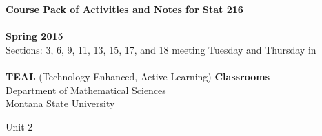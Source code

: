 \documentclass[12pt]{article}
\def\unitNum{1}
\begin{document}
 \begin{titlepage}
  \vspace*{2in}
 \begin{center}
 {\Large \bf  Course Pack of Activities and Notes for Stat 216}\\
  \ \\
  {\large\bf Spring 2015} \vspace{.2in}\\
  Sections: 3, 6, 9, 11, 13, 15, 17, and 18  meeting Tuesday and Thursday
  in\\
  \ \\
  {\Large \bf TEAL} (Technology Enhanced, Active Learning) {\Large
      \bf Classrooms}\vspace{.4in}\\

  Department of Mathematical Sciences\\
  Montana State University
  \end{center}
 \vspace*{\fill}
 \end{titlepage}

\newpage



\setcounter{page}{1}
\newpage

\newpage

\newpage

\newpage

\newpage

\newpage

\newpage

\newpage

 \newpage

  \def\unitNum{2}
\thispagestyle{empty}
\vspace*{\fill}
\begin{center}
  {\huge Unit 2}   %
\end{center}
\vspace*{\fill}
\newpage
\ \ \ \thispagestyle{empty}

 \newpage
  \setcounter{page}{42}
  
  \newpage
 
 \newpage
 
 \newpage
% 
 
 \newpage
 
 \newpage
 
 \newpage
 
 \newpage
 
 \newpage
 
 \newpage
 

% 
% 
% 
% 
% 
% 
% 
% 
 
\end{document}
